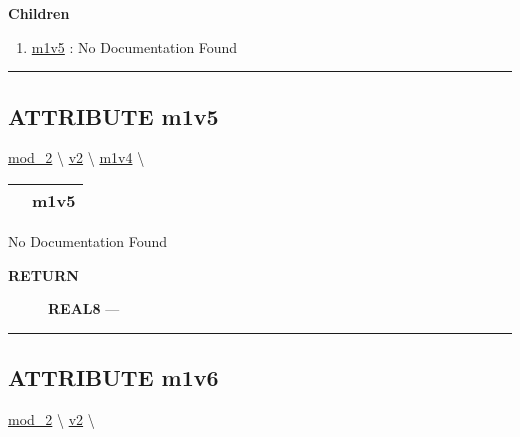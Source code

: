 \textbf{Children}
\begin{enumerate}
\item \hyperlink{ecldoc:mod_1.m1v4.m1v5}{m1v5}
: No Documentation Found
\end{enumerate}

\rule{\linewidth}{0.5pt}

\subsection*{\textsf{\colorbox{headtoc}{\color{white} ATTRIBUTE}
m1v5}}

\hypertarget{ecldoc:mod_1.m1v4.m1v5}{}
\hspace{0pt} \hyperlink{ecldoc:mod_2}{mod_2} \textbackslash 
\hspace{0pt} \hyperlink{ecldoc:mod_1}{v2} \textbackslash 
\hspace{0pt} \hyperlink{ecldoc:mod_1.m1v4}{m1v4} \textbackslash 

{\renewcommand{\arraystretch}{1.5}
\begin{tabularx}{\textwidth}{|>{\raggedright\arraybackslash}l|X|}
\hline
\hspace{0pt}\mytexttt{\color{red} } & \textbf{m1v5} \\
\hline
\end{tabularx}
}

\par





No Documentation Found








\par
\begin{description}
\item [\colorbox{tagtype}{\color{white} \textbf{\textsf{RETURN}}}] \textbf{REAL8} --- 
\end{description}




\rule{\linewidth}{0.5pt}


\subsection*{\textsf{\colorbox{headtoc}{\color{white} ATTRIBUTE}
m1v6}}

\hypertarget{ecldoc:mod_1.m1v6}{}
\hspace{0pt} \hyperlink{ecldoc:mod_2}{mod_2} \textbackslash 
\hspace{0pt} \hyperlink{ecldoc:mod_1}{v2} \textbackslash 

